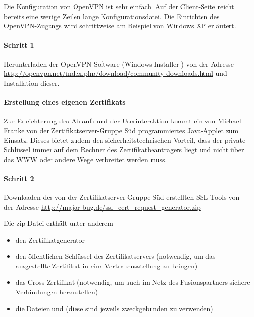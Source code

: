 Die Konfiguration von OpenVPN ist sehr einfach. Auf der Client-Seite reicht
bereits eine wenige Zeilen lange Konfigurationsdatei. Die Einrichten des
OpenVPN\hyp Zugangs wird schrittweise am Beispiel von Windows XP erläutert.

\paragraph{Schritt 1}
Herunterladen der OpenVPN-Software (Windows Installer
) von der Adresse
\url{http://openvpn.net/index.php/download/community-downloads.html} und
Installation dieser.

\paragraph{Erstellung eines eigenen Zertifikats}
Zur Erleichterung des Ablaufs und der Userinteraktion kommt ein von Michael
Franke von der Zertifikatserver-Gruppe Süd programmiertes Java-Applet zum
Einsatz. Dieses bietet zudem den sicherheitstechnischen Vorteil, dass der
private Schlüssel immer auf dem Rechner des Zertifikatbeantragers liegt und
nicht über das WWW oder andere Wege verbreitet werden muss.


\paragraph{Schritt 2}

Downloaden des von der Zertifikatserver-Gruppe Süd erstellten SSL-Tools von der
Adresse \url{http://major-bug.de/ssl_cert_request_generator.zip}

Die zip-Datei enthält unter anderem

\begin{itemize}
  \item den Zertifikatgenerator
  \item den öffentlichen Schlüssel  des
    Zertifikatservers (notwendig, um das ausgestellte Zertifikat in eine
    Vertrauensstellung zu bringen)
  \item das Cross-Zertifikat  (notwendig, um
    auch im Netz des Fusionspartners sichere Verbindungen herzustellen)
  \item die Dateien  und
     (diese sind jeweils zweckgebunden zu
    verwenden)
\end{itemize}

